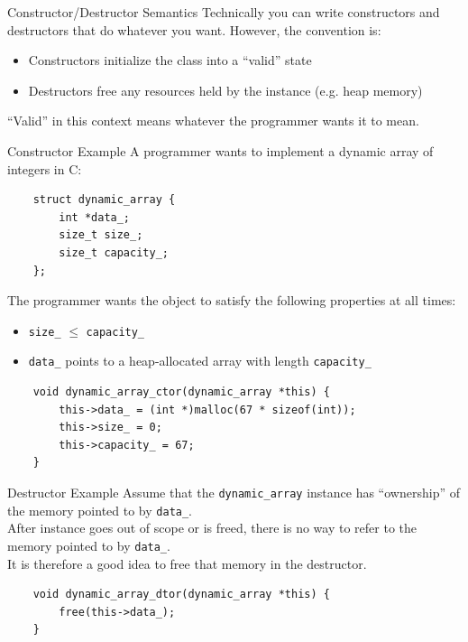 \begin{frame}[fragile]{Constructor/Destructor Semantics}
  Technically you can write constructors and destructors that do whatever you want.
  However, the convention is:
  \begin{itemize}
    \item Constructors initialize the class into a ``valid'' state
    \item Destructors free any resources held by the instance (e.g. heap memory)
  \end{itemize}

  ``Valid'' in this context means whatever the programmer wants it to mean.

\end{frame}

\begin{frame}[fragile]{Constructor Example}
  A programmer wants to implement a dynamic array of integers in C:
  \begin{verbatim}
    struct dynamic_array {
        int *data_;
        size_t size_;
        size_t capacity_;
    };
  \end{verbatim}

  The programmer wants the object to satisfy the following properties at all times:
  \begin{itemize}
    \item \verb|size_| $\leq$ \verb|capacity_|
    \item \verb|data_| points to a heap-allocated array with length \verb|capacity_|
  \end{itemize}

  \begin{verbatim}
    void dynamic_array_ctor(dynamic_array *this) {
        this->data_ = (int *)malloc(67 * sizeof(int));
        this->size_ = 0;
        this->capacity_ = 67;
    }
  \end{verbatim}
\end{frame}


\begin{frame}[fragile]{Destructor Example}
  Assume that the \verb|dynamic_array| instance has ``ownership'' of the memory pointed to by \verb|data_|.\\
  After instance goes out of scope or is freed, there is no way to refer to the memory pointed to by \verb|data_|.\\
  It is therefore a good idea to free that memory in the destructor.

  \begin{verbatim}
    void dynamic_array_dtor(dynamic_array *this) {
        free(this->data_);
    }
  \end{verbatim}
\end{frame}

